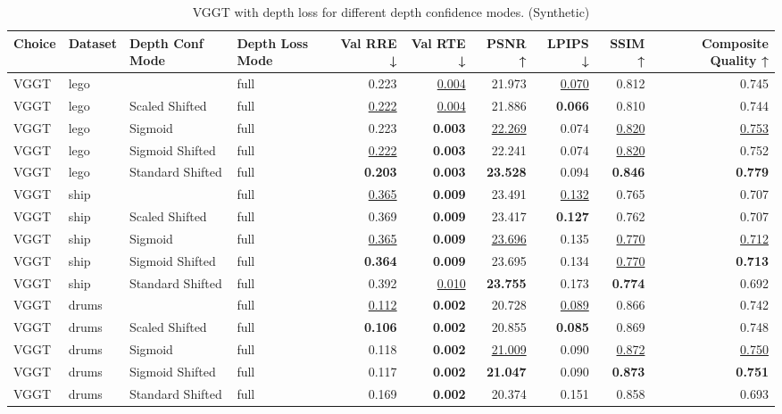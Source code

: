 \begin{table}[H]
\caption{\ifdefined\customcaption \customcaption \else VGGT with depth loss for different depth confidence modes. (Synthetic) \fi}
\label{tab:05_depth_conf_mode_brief_synthetic}
\centering
\scriptsize
\begin{tabular}{llllrrrrrr}
\toprule
Choice & Dataset & Depth Conf Mode & Depth Loss Mode & Val RRE ↓ & Val RTE ↓ & PSNR ↑ & LPIPS ↓ & SSIM ↑ & Composite Quality ↑ \\
\midrule
VGGT & lego &  & full & 0.223 & \underline{0.004} & 21.973 & \underline{0.070} & 0.812 & 0.745 \\
VGGT & lego & Scaled Shifted & full & \underline{0.222} & \underline{0.004} & 21.886 & \textbf{0.066} & 0.810 & 0.744 \\
VGGT & lego & Sigmoid & full & 0.223 & \textbf{0.003} & \underline{22.269} & 0.074 & \underline{0.820} & \underline{0.753} \\
VGGT & lego & Sigmoid Shifted & full & \underline{0.222} & \textbf{0.003} & 22.241 & 0.074 & \underline{0.820} & 0.752 \\
VGGT & lego & Standard Shifted & full & \textbf{0.203} & \textbf{0.003} & \textbf{23.528} & 0.094 & \textbf{0.846} & \textbf{0.779} \\
\midrule
VGGT & ship &  & full & \underline{0.365} & \textbf{0.009} & 23.491 & \underline{0.132} & 0.765 & 0.707 \\
VGGT & ship & Scaled Shifted & full & 0.369 & \textbf{0.009} & 23.417 & \textbf{0.127} & 0.762 & 0.707 \\
VGGT & ship & Sigmoid & full & \underline{0.365} & \textbf{0.009} & \underline{23.696} & 0.135 & \underline{0.770} & \underline{0.712} \\
VGGT & ship & Sigmoid Shifted & full & \textbf{0.364} & \textbf{0.009} & 23.695 & 0.134 & \underline{0.770} & \textbf{0.713} \\
VGGT & ship & Standard Shifted & full & 0.392 & \underline{0.010} & \textbf{23.755} & 0.173 & \textbf{0.774} & 0.692 \\
\midrule
VGGT & drums &  & full & \underline{0.112} & \textbf{0.002} & 20.728 & \underline{0.089} & 0.866 & 0.742 \\
VGGT & drums & Scaled Shifted & full & \textbf{0.106} & \textbf{0.002} & 20.855 & \textbf{0.085} & 0.869 & 0.748 \\
VGGT & drums & Sigmoid & full & 0.118 & \textbf{0.002} & \underline{21.009} & 0.090 & \underline{0.872} & \underline{0.750} \\
VGGT & drums & Sigmoid Shifted & full & 0.117 & \textbf{0.002} & \textbf{21.047} & 0.090 & \textbf{0.873} & \textbf{0.751} \\
VGGT & drums & Standard Shifted & full & 0.169 & \textbf{0.002} & 20.374 & 0.151 & 0.858 & 0.693 \\
\bottomrule
\end{tabular}
\end{table}